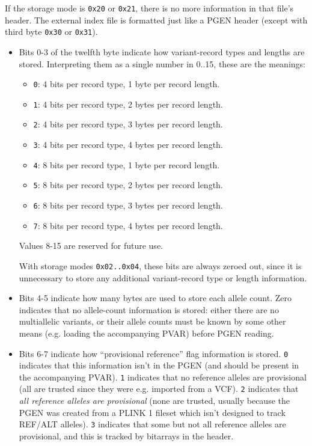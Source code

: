 \documentclass[8pt]{article}
\begin{document}
If the storage mode is \texttt{0x20} or \texttt{0x21}, there is no more
information in that file's header.  The external index file is formatted just
like a PGEN header (except with third byte \texttt{0x30} or \texttt{0x31}).

\begin{itemize}
  \itemsep0em
\item Bits 0-3 of the twelfth byte indicate how variant-record types and
  lengths are stored.  Interpreting them as a single number in 0..15, these are
  the meanings:
  \begin{itemize}
  \item \texttt{0}: 4 bits per record type, 1 byte per record length.
  \item \texttt{1}: 4 bits per record type, 2 bytes per record length.
  \item \texttt{2}: 4 bits per record type, 3 bytes per record length.
  \item \texttt{3}: 4 bits per record type, 4 bytes per record length.
  \item \texttt{4}: 8 bits per record type, 1 byte per record length.
  \item \texttt{5}: 8 bits per record type, 2 bytes per record length.
  \item \texttt{6}: 8 bits per record type, 3 bytes per record length.
  \item \texttt{7}: 8 bits per record type, 4 bytes per record length.
  \end{itemize}
  Values 8-15 are reserved for future use.

  With storage modes \texttt{0x02..0x04}, these bits are always zeroed out,
  since it is unnecessary to store any additional variant-record type or length
  information.
  \item Bits 4-5 indicate how many bytes are used to store each allele count.
    Zero indicates that no allele-count information is stored: either there are
    no multiallelic variants, or their allele counts must be known by some
    other means (e.g. loading the accompanying PVAR) before PGEN reading.
  \item Bits 6-7 indicate how ``provisional reference'' flag information is
    stored.  \texttt{0} indicates that this information isn't in the PGEN (and
    should be present in the accompanying PVAR).  \texttt{1} indicates that
    no reference alleles are provisional (all are trusted since they were e.g.
    imported from a VCF).  \texttt{2} indicates that \textit{all reference
    alleles are provisional} (none are trusted, usually because the PGEN was
    created from a PLINK 1 fileset which isn't designed to track REF/ALT
    alleles).  \texttt{3} indicates that some but not all reference alleles are
    provisional, and this is tracked by bitarrays in the header.
\end{itemize}
\end{document}
